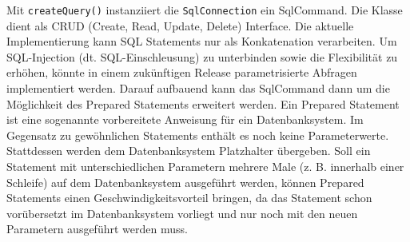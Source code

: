 \documentclass[]{article}
\newenvironment{Shaded}{\begin{snugshade}}{\end{snugshade}}
\newcommand{\CommentTok}[1]{\textcolor[rgb]{0.56,0.35,0.01}{\textit{#1}}}
\newcommand{\DataTypeTok}[1]{\textcolor[rgb]{0.13,0.29,0.53}{#1}}
\newcommand{\KeywordTok}[1]{\textcolor[rgb]{0.13,0.29,0.53}{\textbf{#1}}}
\newcommand{\NormalTok}[1]{#1}
\newcommand{\OperatorTok}[1]{\textcolor[rgb]{0.81,0.36,0.00}{\textbf{#1}}}
\newcommand{\StringTok}[1]{\textcolor[rgb]{0.31,0.60,0.02}{#1}}
\begin{document}
\begin{Shaded}
\end{Shaded}

Mit \texttt{createQuery()} instanziiert die \texttt{SqlConnection} ein
SqlCommand. Die Klasse dient als CRUD (Create, Read, Update, Delete)
Interface. Die aktuelle Implementierung kann SQL Statements nur als
Konkatenation verarbeiten. Um SQL-Injection (dt. SQL-Einschleusung) zu
unterbinden sowie die Flexibilität zu erhöhen, könnte in einem
zukünftigen Release parametrisierte Abfragen implementiert werden.
Darauf aufbauend kann das SqlCommand dann um die Möglichkeit des
Prepared Statements erweitert werden. Ein Prepared Statement ist eine
sogenannte vorbereitete Anweisung für ein Datenbanksystem. Im Gegensatz
zu gewöhnlichen Statements enthält es noch keine Parameterwerte.
Stattdessen werden dem Datenbanksystem Platzhalter übergeben. Soll ein
Statement mit unterschiedlichen Parametern mehrere Male (z. B. innerhalb
einer Schleife) auf dem Datenbanksystem ausgeführt werden, können
Prepared Statements einen Geschwindigkeitsvorteil bringen, da das
Statement schon vorübersetzt im Datenbanksystem vorliegt und nur noch
mit den neuen Parametern ausgeführt werden muss.
\end{document}
